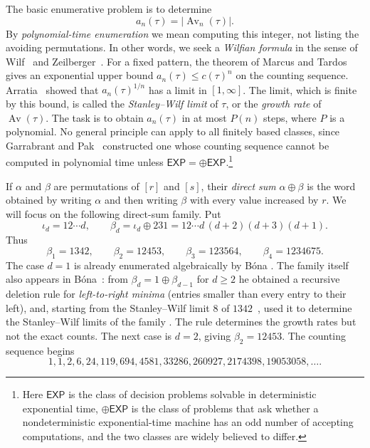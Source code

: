 \documentclass[11pt,reqno]{amsart}
\theoremstyle{definition}
\theoremstyle{remark}
\newcommand{\Av}{\operatorname{Av}}
\begin{document}
The basic enumerative problem is to determine
\[
  a_n(\tau)=\lvert\Av_n(\tau)\rvert.
\]
By \emph{polynomial-time enumeration} we mean computing this integer, not
listing the avoiding permutations.  In other words, we seek a \emph{Wilfian formula} in the sense of
Wilf~\cite{Wilf1982} and Zeilberger~\cite{Zeilberger1998}.  For a fixed pattern,
the theorem of Marcus and Tardos~\cite{MarcusTardos2004} gives an
exponential upper bound $a_n(\tau)\leq c(\tau)^n$ on the counting sequence.
Arratia~\cite{Arratia1999} showed that $a_n(\tau)^{1/n}$ has a limit in
$[1,\infty]$.  The limit, which is finite by this bound, is called the \emph{Stanley--Wilf
limit} of $\tau$, or the \emph{growth rate} of $\Av(\tau)$.  The task is to obtain $a_n(\tau)$ in at most $P(n)$
steps, where $P$ is a polynomial.
No general principle
can apply to all finitely based classes, since
Garrabrant and Pak~\cite{GarrabrantPak2016} constructed one whose counting
sequence cannot be computed in polynomial time
unless $\mathsf{EXP}=\mathsf{\oplus EXP}$.\footnote{Here
$\mathsf{EXP}$ is the class of decision problems solvable in deterministic
exponential time, $\mathsf{\oplus EXP}$ is the class of problems that ask
whether a nondeterministic exponential-time machine has an odd number of
accepting computations, and the two classes are widely believed to differ.}

If $\alpha$ and $\beta$ are permutations of $[r]$ and $[s]$, their
\emph{direct sum}
$\alpha\oplus\beta$ is the word obtained by writing $\alpha$ and then
writing $\beta$ with every value increased by $r$.  We will focus on the following direct-sum
family.  Put
\begin{equation}\label{eq:family}
 \iota_d=12\cdots d,
 \qquad
 \beta_d=\iota_d\oplus231
 =12\cdots d\,(d+2)(d+3)(d+1).
\end{equation}
Thus
\[
 \beta_1=1342,\qquad \beta_2=12453,\qquad
 \beta_3=123564,\qquad \beta_4=1234675.
\]
The case $d=1$ is already enumerated algebraically by B\'ona
\cite{Bona1997}.
The family itself also appears in B\'ona~\cite{Bona2005}: from
$\beta_d=1\oplus\beta_{d-1}$ for $d\geq2$ he obtained a recursive deletion
rule for \emph{left-to-right minima} (entries smaller than every entry to
their left), and, starting from the Stanley--Wilf limit $8$ of
$1342$~\cite{Bona1997}, used it to determine the Stanley--Wilf limits of the
family \cite[Proposition~5.1 and Theorem~5.2]{Bona2005}.  The rule determines
the growth rates but not the exact counts.
The next case is $d=2$, giving $\beta_2 = 12453$.  The counting sequence begins
\begin{equation}\label{eq:first-terms}
  1,1,2,6,24,119,694,4581,33286,260927,2174398,19053058,\ldots.
\end{equation}
\end{document}
